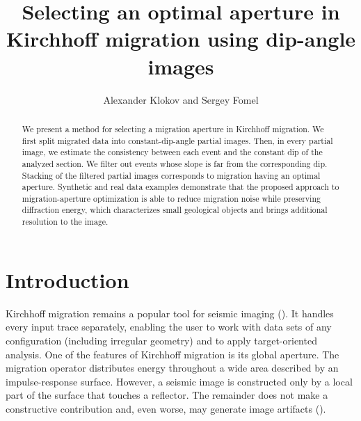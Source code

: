 
\title{Selecting an optimal aperture in Kirchhoff migration using dip-angle images}


\author{Alexander Klokov and Sergey Fomel}

\address {
Bureau of Economic Geology, 
Jackson School of Geosciences, 
The University of Texas at Austin, 
University Station, Box X, 
Austin, TX 78713-8924, 
USA 
}

\maketitle

\begin{abstract}
We present a method for selecting a migration aperture in Kirchhoff migration.
We first split migrated data into constant-dip-angle partial images. Then,
in every partial image, we estimate the consistency between each event and the constant dip of the analyzed
section. We filter out events whose slope is far from the corresponding dip. Stacking of the filtered
partial images corresponds to migration having an optimal aperture. Synthetic and real data examples
demonstrate that the proposed approach to migration-aperture optimization is able to reduce migration noise while
preserving diffraction energy, which characterizes small geological objects and brings additional resolution to the image. 
\end{abstract}

\section{Introduction}
Kirchhoff migration remains a popular tool for seismic imaging (\citealp[]{leveille11}).
It handles every input trace separately, enabling the user to work with data sets of any configuration (including
irregular geometry) and to apply target-oriented analysis. One of the features of Kirchhoff migration 
is its global aperture. The migration operator distributes energy throughout a wide area described by 
an impulse-response surface. However, a seismic image is constructed only by a local part of the surface that
touches a reflector. The remainder does not make a constructive contribution and, even worse, may generate
image artifacts (\citealp[]{sun98,hertweck03}).

